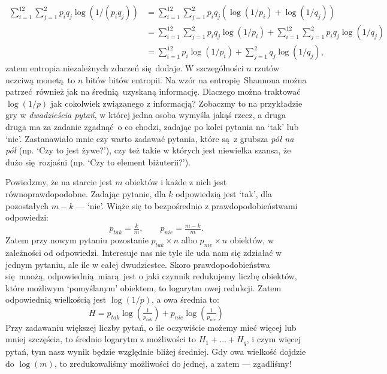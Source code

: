 \documentclass[10pt,a4paper]{article}
\begin{document}
\begin{align}
    \sum_{i=1}^{12} \sum_{j=1}^2 p_i q_j \log(1/(p_i q_j))
    &= \sum_{i=1}^{12} \sum_{j=1}^2 p_i q_j \left( \log(1/p_i) + \log(1/q_j) \right)\\
    &= \sum_{i=1}^{12} \sum_{j=1}^2 p_i q_j \log(1/p_i)
    +\sum_{i=1}^{12} \sum_{j=1}^2 p_i q_j \log(1/q_j)\\
    &= \sum_{i=1}^{12} p_i \log(1/p_i)
    + \sum_{j=1}^2 q_j \log(1/q_j),
\end{align}
%
zatem entropia niezależnych zdarzeń się dodaje.
W szczególności $n$ rzutów uczciwą monetą to $n$ bitów bitów entropii.
%
%
Na wzór na entropię Shannona można patrzeć również jak na średnią uzyskaną informację.
Dlaczego można traktować $\log(1/p)$ jak cokolwiek związanego z informacją?
Zobaczmy to na przykładzie gry w \emph{dwadzieścia pytań}, w której jedna osoba wymyśla jakąś rzecz, a druga druga ma za zadanie zgadnąć o co chodzi, zadając po kolei pytania na `tak' lub `nie'.
Zastanawiało mnie czy warto zadawać pytania, które są z grubsza \emph{pół na pół} (np. `Czy to jest żywe?'), czy też takie w których jest niewielka szansa, że dużo się rozjaśni (np. `Czy to element biżuterii?').

Powiedzmy, że na starcie jest $m$ obiektów i każde z nich jest równoprawdopodobne.
Zadając pytanie, dla $k$ odpowiedzią jest `tak', dla pozostałych $m-k$ --- `nie'.
Wiąże się to bezpośrednio z prawdopodobieństwami odpowiedzi:
%
\begin{equation}
    p_{tak} = \tfrac{k}{m}, \qquad p_{nie} = \tfrac{m-k}{m}.
\end{equation}
%
Zatem przy nowym pytaniu pozostanie $p_{tak} \times n$ albo $p_{nie} \times n$ obiektów, w zależności od odpowiedzi.
Interesuje nas nie tyle ile uda nam się zdziałać w jednym pytaniu, ale ile w całej dwudziestce.
Skoro prawdopodobieństwa się mnożą, odpowiednią miarą jest o jaki czynnik redukujemy liczbę obiektów, które możliwym `pomyślanym' obiektem, to logarytm owej redukcji.
Zatem odpowiednią wielkością jest $\log(1/p)$, a owa średnia to:
%
\begin{equation}
    H = p_{tak} \log \left(\tfrac{1}{p_{tak}} \right) + p_{nie} \log \left(\tfrac{1}{p_{nie}} \right)
\end{equation}
%
Przy zadawaniu większej liczby pytań, o ile oczywiście możemy mieć więcej lub mniej szczęścia, to średnio logarytm z możliwości to $H_1 + \ldots + H_{q}$, i czym więcej pytań, tym nasz wynik będzie względnie bliżej średniej. 
Gdy owa wielkość dojdzie do $\log(m)$, to zredukowaliśmy możliwości do jednej, a zatem --- zgadliśmy!
\end{document}
